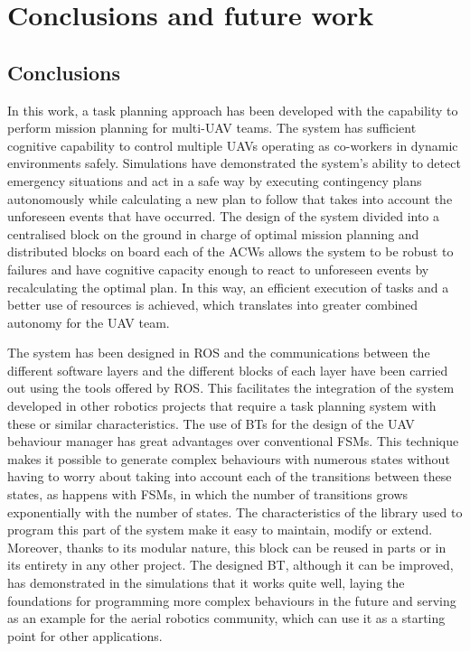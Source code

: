 \chapter{Conclusions and future work}
\label{ch:ConclusionsAndFutureWork}

\section{Conclusions}
\label{sec:Conclusions}
In this work, a task planning approach has been developed with the capability to perform mission planning for multi-\gls{UAV} teams. The system has sufficient cognitive capability to control multiple \glspl{UAV} operating as co-workers in dynamic environments safely. Simulations have demonstrated the system's ability to detect emergency situations and act in a safe way by executing contingency plans autonomously while calculating a new plan to follow that takes into account the unforeseen events that have occurred. The design of the system divided into a centralised block on the ground in charge of optimal mission planning and distributed blocks on board each of the \glspl{ACW} allows the system to be robust to failures and have cognitive capacity enough to react to unforeseen events by recalculating the optimal plan. In this way, an efficient execution of tasks and a better use of resources is achieved, which translates into greater combined autonomy for the \gls{UAV} team.

The system has been designed in \gls{ROS} and the communications between the different software layers and the different blocks of each layer have been carried out using the tools offered by \gls{ROS}. This facilitates the integration of the system developed in other robotics projects that require a task planning system with these or similar characteristics. The use of \glspl{BT} for the design of the \gls{UAV} behaviour manager has great advantages over conventional \glspl{FSM}. This technique makes it possible to generate complex behaviours with numerous states without having to worry about taking into account each of the transitions between these states, as happens with \glspl{FSM}, in which the number of transitions grows exponentially with the number of states. The characteristics of the library used to program this part of the system make it easy to maintain, modify or extend. Moreover, thanks to its modular nature, this block can be reused in parts or in its entirety in any other project. The designed \gls{BT}, although it can be improved, has demonstrated in the simulations that it works quite well, laying the foundations for programming more complex behaviours in the future and serving as an example for the aerial robotics community, which can use it as a starting point for other applications. 

